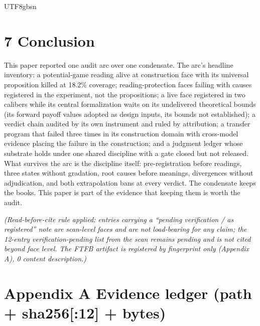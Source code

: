 \documentclass[11pt,letterpaper]{article}
\begin{document}
\begin{CJK}{UTF8}{gbsn}
\section*{7 Conclusion}

This paper reported one audit arc over one condensate. The arc's headline inventory: a potential-game reading alive at construction face with its universal proposition killed at 18.2\% coverage; reading-protection faces failing with causes registered in the experiment, not the propositions; a live face registered in two calibers while its central formalization waits on its undelivered theoretical bounds (its forward payoff values adopted as design inputs, its bounds not established); a verdict chain audited by its own instrument and ruled by attribution; a transfer program that failed three times in its construction domain with cross-model evidence placing the failure in the construction; and a judgment ledger whose substrate holds under one shared discipline with a gate closed but not released. What survives the arc is the discipline itself: pre-registration before readings, three states without gradation, root causes before meanings, divergences without adjudication, and both extrapolation bans at every verdict. The condensate keeps the books. This paper is part of the evidence that keeping them is worth the audit.

\emph{(Read-before-cite rule applied: entries carrying a ``pending verification / as registered'' note are scan-level faces and are not load-bearing for any claim; the 12-entry verification-pending list from the scan remains pending and is not cited beyond face level. The FTFB artifact is registered by fingerprint only (Appendix A), 0 content description.)}

\section*{Appendix A \textemdash{} Evidence ledger (path + sha256[:12] + bytes)}


\end{CJK}
\end{document}
